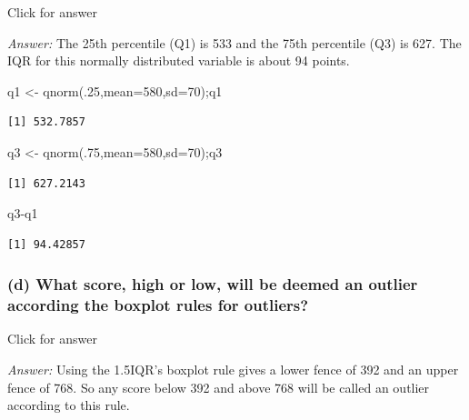 \documentclass[
]{book}
\newenvironment{Shaded}{\begin{snugshade}}{\end{snugshade}}
\newcommand{\AttributeTok}[1]{\textcolor[rgb]{0.77,0.63,0.00}{#1}}
\newcommand{\DecValTok}[1]{\textcolor[rgb]{0.00,0.00,0.81}{#1}}
\newcommand{\FunctionTok}[1]{\textcolor[rgb]{0.00,0.00,0.00}{#1}}
\newcommand{\NormalTok}[1]{#1}
\newcommand{\OtherTok}[1]{\textcolor[rgb]{0.56,0.35,0.01}{#1}}
\newcommand{\SpecialCharTok}[1]{\textcolor[rgb]{0.00,0.00,0.00}{#1}}
\begin{document}
Click for answer

\emph{Answer:} The 25th percentile (Q1) is 533 and the 75th percentile (Q3) is 627. The IQR for this normally distributed variable is about 94 points.

\begin{Shaded}
\begin{Highlighting}[]
\NormalTok{q1 }\OtherTok{\textless{}{-}} \FunctionTok{qnorm}\NormalTok{(.}\DecValTok{25}\NormalTok{,}\AttributeTok{mean=}\DecValTok{580}\NormalTok{,}\AttributeTok{sd=}\DecValTok{70}\NormalTok{);q1}
\end{Highlighting}
\end{Shaded}

\begin{verbatim}
[1] 532.7857
\end{verbatim}

\begin{Shaded}
\begin{Highlighting}[]
\NormalTok{q3 }\OtherTok{\textless{}{-}} \FunctionTok{qnorm}\NormalTok{(.}\DecValTok{75}\NormalTok{,}\AttributeTok{mean=}\DecValTok{580}\NormalTok{,}\AttributeTok{sd=}\DecValTok{70}\NormalTok{);q3}
\end{Highlighting}
\end{Shaded}

\begin{verbatim}
[1] 627.2143
\end{verbatim}

\begin{Shaded}
\begin{Highlighting}[]
\NormalTok{q3}\SpecialCharTok{{-}}\NormalTok{q1}
\end{Highlighting}
\end{Shaded}

\begin{verbatim}
[1] 94.42857
\end{verbatim}

\hypertarget{d-what-score-high-or-low-will-be-deemed-an-outlier-according-the-boxplot-rules-for-outliers}{%
\subsubsection{(d) What score, high or low, will be deemed an outlier according the boxplot rules for outliers?}\label{d-what-score-high-or-low-will-be-deemed-an-outlier-according-the-boxplot-rules-for-outliers}}

Click for answer

\emph{Answer:} Using the 1.5IQR's boxplot rule gives a lower fence of 392 and an upper fence of 768. So any score below 392 and above 768 will be called an outlier according to this rule.
\end{document}
